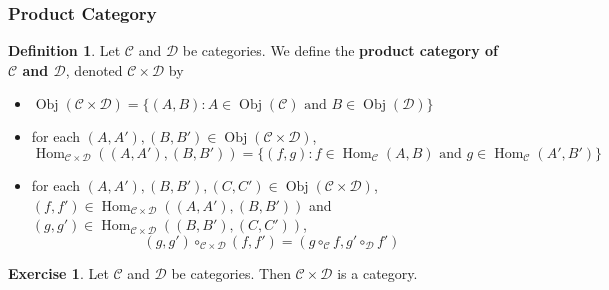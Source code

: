 \documentclass[12pt]{amsart}
\theoremstyle{definition}
\newtheorem{defn}[definition]{Definition}
\newtheorem{ex}[definition]{Exercise}
\newcommand{\MC}{\mathcal{C}}
\newcommand{\MD}{\mathcal{D}}
\DeclareMathOperator{\Obj}{Obj}
\DeclareMathOperator{\Hom}{Hom}
\DeclareMathOperator*{\0}{\mbf{0}}
\DeclareMathOperator*{\1}{\mbf{1}}
\begin{document}
	
	\subsubsection{Product Category}
	
	\begin{defn}
		Let $\MC$ and $\MD$ be categories. We define the \textbf{product category of $\MC$ and $\MD$}, denoted $\MC \times \MD$ by 
		\begin{itemize}
			\item $\Obj(\MC \times \MD) = \{(A, B): A \in \Obj(\MC) \text{ and } B \in \Obj(\MD)\}$
			\item for each $(A, A'), (B, B') \in \Obj(\MC \times \MD)$, $\Hom_{\MC \times \MD}((A, A'), (B, B')) = \{(f,g): f \in \Hom_{\MC}(A, B) \text{ and }  g \in \Hom_{\MC}(A', B') \}$
			\item for each  $(A, A'), (B, B'), (C, C') \in \Obj(\MC \times \MD)$, $(f, f') \in \Hom_{\MC \times \MD}((A, A'), (B, B'))$ and $(g, g') \in \Hom_{\MC \times \MD}((B, B'), (C, C'))$, 
			$$(g,g') \circ_{\MC \times \MD} (f, f') = (g \circ_{\MC} f, g' \circ_{\MD} f')$$
		\end{itemize}
	\end{defn}
	
	\begin{ex}
		Let $\MC$ and $\MD$ be categories. Then $\MC \times \MD$ is a category. 
	\end{ex}
	
\end{document}

